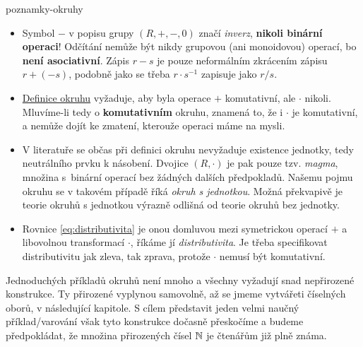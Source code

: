 \begin{remark}{}{poznamky-okruhy}
 \vspace{-\parskip}
 \begin{itemize}
  \item Symbol $-$ v popisu grupy $(R,+,-,0)$ značí \emph{inverz},
   \textbf{nikoli binární operaci}! Odčítání nemůže být nikdy grupovou (ani
   monoidovou) operací, bo \textbf{není asociativní}. Zápis $r - s$ je pouze
   neformálním zkrácením zápisu $r + (-s)$, podobně jako se třeba $r \cdot
   s^{-1}$ zapisuje jako $r / s$.
  \item \hyperref[def:okruh]{Definice okruhu} vyžaduje, aby byla operace $+$
   komutativní, ale $ \cdot $ nikoli. Mluvíme-li tedy o \textbf{komutativním}
   okruhu, znamená to, že i $ \cdot $ je komutativní, a nemůže dojít ke zmatení,
   kterouže operaci máme na mysli.
  \item V literatuře se občas při definici okruhu nevyžaduje existence jednotky,
   tedy neutrálního prvku k násobení. Dvojice $(R, \cdot )$ je pak pouze tzv.
   \emph{magma}, množina s~binární operací bez žádných dalších předpokladů.
   Našemu pojmu okruhu se v takovém případě říká \emph{okruh s jednotkou}. Možná
   překvapivě je teorie okruhů s jednotkou výrazně odlišná od teorie okruhů bez
   jednotky.
  \item Rovnice \eqref{eq:distributivita} je onou  domluvou mezi
   symetrickou operací $+$ a libovolnou transformací $ \cdot $, říkáme jí
   \emph{distributivita}. Je třeba specifikovat distributivitu jak zleva, tak
   zprava, protože $ \cdot $ nemusí být komutativní.
 \end{itemize}
\end{remark}

Jednoduchých příkladů okruhů není mnoho a všechny vyžadují snad nepřirozené
konstrukce. Ty přirozené vyplynou samovolně, až se jmeme vytvářeti číselných
oborů, v následující kapitole. S cílem představit jeden velmi naučný
příklad/varování však tyto konstrukce dočasně přeskočíme a budeme předpokládat,
že množina přirozených čísel $\mathbb{N}$ je čtenářům již plně známa.

